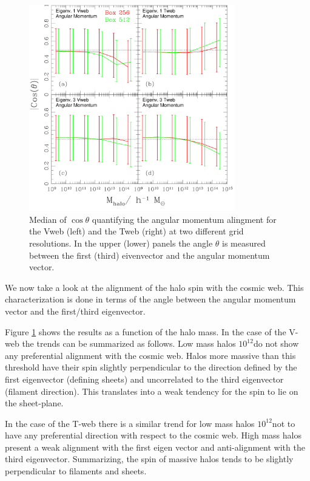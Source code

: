 \documentclass[usenatbib]{mn2e}
\newcommand{\hMsun}{{\ifmmode{h^{-1}{\rm
        {M_{\odot}}}}\else{$h^{-1}{\rm{M_{\odot}}}$}\fi}}
\begin{document}
\begin{figure}
\includegraphics[width=0.80\textwidth]{Fig3.pdf}
\caption{Median of $\cos\theta$ quantifying the angular momentum
  alingment for the Vweb (left) and the Tweb (right) at two different
  grid resolutions. In the upper (lower)  panels the angle $\theta$ is
  measured between the first (third) eivenvector and the angular
  momentum vector.\label{fig:spin_alignment}} 
\end{figure}


We now take a look at the alignment of the halo spin with the cosmic
web. This characterization is done in terms of the angle between the
angular momentum vector and the first/third eigenvector.

Figure \ref{fig:spin_alignment} shows the results as a function of
the halo mass. In the case of the V-web the trends can be summarized
as follows. Low mass halos $10^{12}$\hMsun do not show any
preferential alignment with the cosmic web. Halos more massive than
this threshold have their spin slightly perpendicular to the
direction defined by the first eigenvector (defining sheets) and
uncorrelated to the third eigenvector (filament direction). This
translates into a weak tendency for the spin to lie on the
sheet-plane. 

In the case of the T-web there is a similar trend for low mass halos
$10^{12}$\hMsun not to have any preferential direction with respect to
the cosmic web. High mass halos present a weak alignment with the
first eigen vector and anti-alignment with the third
eigenvector. Summarizing, the spin of massive halos tends to be
slightly perpendicular to filaments and sheets.
\end{document}
